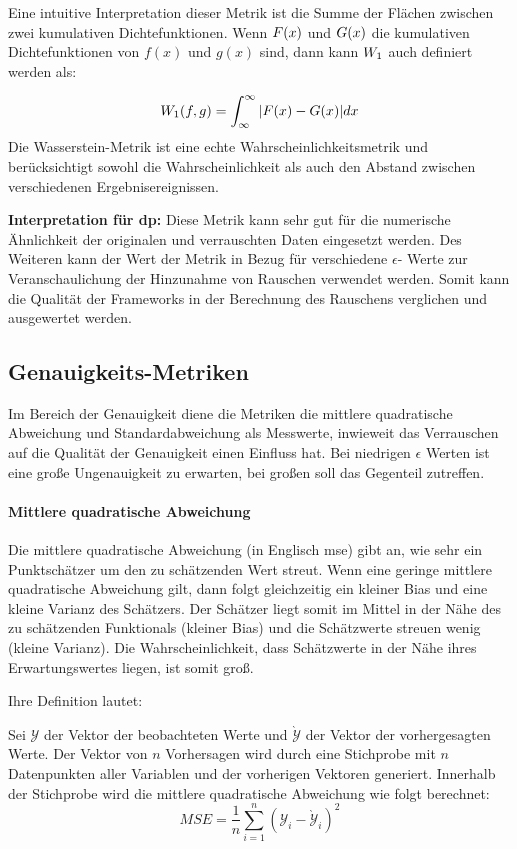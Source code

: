 Eine intuitive Interpretation dieser Metrik ist die Summe der Flächen zwischen zwei kumulativen Dichtefunktionen. Wenn $F(x)$ und $G(x)$ die kumulativen Dichtefunktionen von $f(x)$ und $g(x)$ sind, dann kann $W_{1}$ auch definiert werden als:

\begin{equation*}
	W_{1} (f,g) = \int_{\infty}^{\infty} |F(x) - G(x)| dx
\end{equation*}
\parencite{WDDef}
Die Wasserstein-Metrik ist eine echte Wahrscheinlichkeitsmetrik und berücksichtigt sowohl die Wahrscheinlichkeit als auch den Abstand zwischen verschiedenen Ergebnisereignissen.

\textbf{Interpretation für \gls{dp}: }
Diese Metrik kann sehr gut für die numerische Ähnlichkeit der originalen und verrauschten Daten eingesetzt werden. Des Weiteren kann der Wert der Metrik in Bezug für verschiedene $\epsilon$- Werte zur Veranschaulichung der Hinzunahme von Rauschen verwendet werden. Somit kann die Qualität der Frameworks in der Berechnung des Rauschens verglichen und ausgewertet werden.

\subsection{Genauigkeits-Metriken}
Im Bereich der Genauigkeit diene die Metriken die mittlere quadratische Abweichung und Standardabweichung als Messwerte, inwieweit das Verrauschen auf die Qualität der Genauigkeit einen Einfluss hat. Bei niedrigen $\epsilon$ Werten ist eine große Ungenauigkeit zu erwarten, bei großen soll das Gegenteil zutreffen.
\paragraph{Mittlere quadratische Abweichung}
Die mittlere quadratische Abweichung (in Englisch \gls{mse}) \parencite{MSE2022} gibt an, wie sehr ein Punktschätzer um den zu schätzenden Wert streut.
Wenn eine geringe mittlere quadratische Abweichung gilt, dann folgt gleichzeitig ein kleiner Bias und eine kleine Varianz des Schätzers. Der Schätzer liegt somit im Mittel in der Nähe des zu schätzenden Funktionals (kleiner Bias) und die Schätzwerte streuen wenig (kleine Varianz). Die Wahrscheinlichkeit, dass Schätzwerte in der Nähe ihres Erwartungswertes liegen, ist somit groß.

Ihre Definition lautet:

Sei $\mathcal{Y}$ der Vektor der beobachteten Werte und $\grave{\mathcal{Y}}$ der Vektor der vorhergesagten Werte. Der Vektor von $n$ Vorhersagen wird durch eine Stichprobe mit $n$ Datenpunkten aller Variablen und der vorherigen Vektoren generiert. Innerhalb der Stichprobe wird die mittlere quadratische Abweichung wie folgt berechnet:
\begin{equation*}
	MSE = \frac{1}{n} \sum_{i=1}^{n} (\mathcal{Y}_{i} -\grave{\mathcal{Y}}_{i})^2
\end{equation*}

